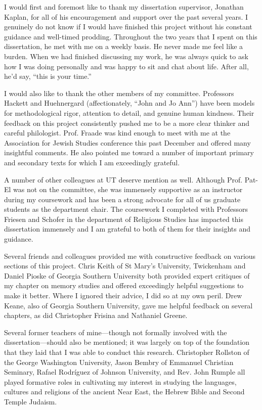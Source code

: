 
I would first and foremost like to thank my dissertation supervisor, Jonathan Kaplan, for all of his encouragement and support over the past several years. I genuinely do not know if I would have finished this project without his constant guidance and well-timed prodding. Throughout the two years that I spent on this dissertation, he met with me on a weekly basis. He never made me feel like a burden. When we had finished discussing my work, he was always quick to ask how I was doing personally and was happy to sit and chat about life. After all, he'd say, ``this is your time.''

I would also like to thank the other members of my committee. Professors Hackett and Huehnergard (affectionately, ``John and Jo Ann'') have been models for methodological rigor, attention to detail, and genuine human kindness. Their feedback on this project consistently pushed me to be a more clear thinker and careful philologist. Prof. Fraade was kind enough to meet with me at the Association for Jewish Studies conference this past December and offered many insightful comments. He also pointed me toward a number of important primary and secondary texts for which I am exceedingly grateful.

A number of other colleagues at UT deserve mention as well. Although Prof. Pat-El was not on the committee, she was immensely supportive as an instructor during my coursework and has been a strong advocate for all of us graduate students as the department chair. The coursework I completed with Professors Friesen and Schofer in the department of Religious Studies has impacted this dissertation immensely and I am grateful to both of them for their insights and guidance.

Several friends and colleagues provided me with constructive feedback on various sections of this project. Chris Keith of St Mary's University, Twickenham and Daniel Pioske of Georgia Southern University both provided expert critiques of my chapter on memory studies and offered exceedingly helpful suggestions to make it better. Where I ignored their advice, I did so at my own peril. Drew Keane, also of Georgia Southern University, gave me helpful feedback on several chapters, as did Christopher Frisina and Nathaniel Greene.

Several former teachers of mine---though not formally involved with the dissertation---should also be mentioned; it was largely on top of the foundation that they laid that I was able to conduct this research. Christopher Rollston of the George Washington University, Jason Bembry of Emmanuel Christian Seminary, Rafael Rodríguez of Johnson University, and Rev. John Rumple all played formative roles in cultivating my interest in studying the languages, cultures and religions of the ancient Near East, the Hebrew Bible and Second Temple Judaism.


